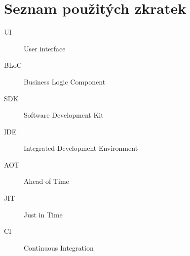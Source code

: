 \chapter{Seznam použitých zkratek}

\begin{description}
	\item[UI] User interface
	\item[BLoC] Business Logic Component 
	\item[SDK] Software Development Kit
	\item[IDE] Integrated Development Environment
	\item[AOT] Ahead of Time
	\item[JIT] Just in Time
	\item[CI] Continuous Integration 
\end{description}
